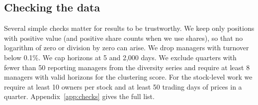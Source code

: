 \subsection{Checking the data}

Several simple checks matter for results to be trustworthy. We keep only positions with positive value (and positive share counts when we use shares), so that no logarithm of zero or division by zero can arise. We drop managers with turnover below 0.1\%. We cap horizons at 5 and 2{,}000 days. We exclude quarters with fewer than 50 reporting managers from the diversity series and require at least 8 managers with valid horizons for the clustering score. For the stock-level work we require at least 10 owners per stock and at least 50 trading days of prices in a quarter. Appendix~\ref{app:checks} gives the full list.
